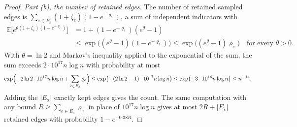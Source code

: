\documentclass[11pt]{article}
\theoremstyle{remark}
\newcommand{\Ex}{\mathbb E}
\begin{document}
\begin{proof}
\emph{Part (b), the number of retained edges.}
The number of retained sampled edges is
$\sum_{e\in E_{\mathrm{s}}}(1+\zeta_e)(1-e^{-\varrho_e})$, a sum of
independent indicators with
\begin{align*}
\Ex\bigl[e^{\theta(1+\zeta_e)(1-e^{-\varrho_e})}\bigr]
&=1+(1-e^{-\varrho_e})(e^{\theta}-1)\\
&\le\exp\bigl((e^{\theta}-1)(1-e^{-\varrho_e})\bigr)
\le\exp\bigl((e^{\theta}-1)\varrho_e\bigr)
\quad\text{for every }\theta>0 .
\end{align*}
With $\theta=\ln2$ and Markov's inequality applied to the exponential of
the sum, the sum exceeds $2\cdot10^{17}n\log n$ with probability at most
\[
\exp\Bigl(-2\ln2\cdot10^{17}n\log n+\sum_{e\in E_{\mathrm{s}}}\varrho_e\Bigr)
\le\exp\bigl(-(2\ln2-1)\cdot10^{17}n\log n\bigr)
\le\exp\bigl(-3\cdot10^{16}n\log n\bigr)\le n^{-14}.
\]
Adding the $|E_{\mathrm{x}}|$ exactly kept edges gives the count.
The same computation with any bound $R\ge\sum_{e\in E_{\mathrm{s}}}\varrho_e$
in place of $10^{17}n\log n$ gives at most $2R+|E_{\mathrm{x}}|$ retained
edges with probability $1-e^{-0.38R}$.


\end{proof}
\end{document}
